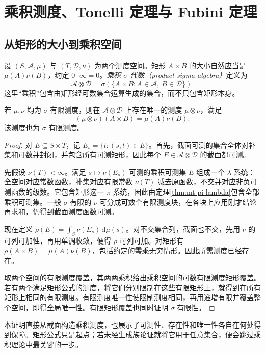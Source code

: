 \setcounter{chapter}{8} %
\chapter{乘积测度、Tonelli 定理与 Fubini 定理}
\label{chap:mt-product}

\section{从矩形的大小到乘积空间}
设 $(S,\mathcal A,\mu)$ 与 $(T,\mathcal D,\nu)$ 为两个测度空间。矩形 $A\times B$ 的大小自然应当是 $\mu(A)\nu(B)$，约定 $0\cdot\infty=0$。\emph{乘积 $\sigma$ 代数（product sigma-algebra）}定义为
\[
 \mathcal A\otimes\mathcal D
 =\sigma(\{A\times B:A\in\mathcal A,\ B\in\mathcal D\}).
\]
这里“乘积”包含由矩形经可数集合运算生成的集合，而不只包含矩形本身。

\begin{theorem}[乘积测度的存在唯一性]
若 $\mu,\nu$ 均为 $\sigma$ 有限测度，则在 $\mathcal A\otimes\mathcal D$ 上存在唯一的测度 $\mu\otimes\nu$，满足
\[
 (\mu\otimes\nu)(A\times B)=\mu(A)\nu(B).
\]
该测度也为 $\sigma$ 有限测度。
\label{thm:mt-product-measure}
\end{theorem}
\begin{proof}
对 $E\subseteq S\times T$，记 $E_s=\{t:(s,t)\in E\}$。首先，截面可测的集合全体对补集和可数并封闭，并包含所有可测矩形，因此每个 $E\in\mathcal A\otimes\mathcal D$ 的截面都可测。

先假设 $\nu(T)<\infty$。满足 $s\mapsto\nu(E_s)$ 可测的乘积可测集 $E$ 组成一个 $\lambda$ 系统：全空间对应常数函数，补集对应有限常数 $\nu(T)$ 减去原函数，不交并对应非负可测函数的级数。它包含矩形这一 $\pi$ 系统，因此由定理\ref{thm:mt-pi-lambda}包含全部乘积可测集。一般 $\sigma$ 有限的 $\nu$ 可分成可数个有限测度块，在各块上应用刚才结论再求和，仍得到截面测度函数可测。

现在定义 $\rho(E)=\int_S\nu(E_s)\,\mathrm d\mu(s)$。对不交集合列，截面也不交，先用 $\nu$ 的可列可加性，再用单调收敛，便得 $\rho$ 可列可加。对矩形有 $\rho(A\times B)=\mu(A)\nu(B)$，包括约定的零乘无穷情形。因此所需测度已经存在。

取两个空间的有限测度覆盖，其两两乘积给出乘积空间的可数有限测度矩形覆盖。若有两个满足矩形公式的测度，将它们分别限制在这些有限矩形上，就得到在所有矩形上相同的有限测度。有限测度唯一性使限制测度相同，再用递增有限并覆盖整个空间，即得全局唯一性。有限矩形覆盖也同时证明 $\sigma$ 有限性。
\end{proof}
本证明直接从截面构造乘积测度，也展示了可测性、存在性和唯一性各自在何处得到保障。矩形公式只是起点；若未经生成族论证就将它用于任意集合，便会跳过乘积理论中最关键的一步。

